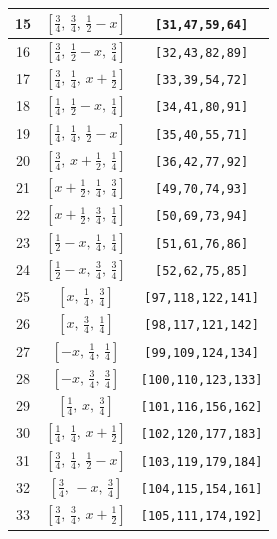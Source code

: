 \documentclass[fleqn,8pt]{jsarticle}
\begin{document}
\begin{longtable}{ccc}
15 & $\left[ \frac{3}{4},\, \frac{3}{4},\, \frac{1}{2} - x \right]$ & {\tt [31,47,59,64]} \\ \hline
16 & $\left[ \frac{3}{4},\, \frac{1}{2} - x,\, \frac{3}{4} \right]$ & {\tt [32,43,82,89]} \\ \hline
17 & $\left[ \frac{3}{4},\, \frac{1}{4},\, x + \frac{1}{2} \right]$ & {\tt [33,39,54,72]} \\ \hline
18 & $\left[ \frac{1}{4},\, \frac{1}{2} - x,\, \frac{1}{4} \right]$ & {\tt [34,41,80,91]} \\ \hline
19 & $\left[ \frac{1}{4},\, \frac{1}{4},\, \frac{1}{2} - x \right]$ & {\tt [35,40,55,71]} \\ \hline
20 & $\left[ \frac{3}{4},\, x + \frac{1}{2},\, \frac{1}{4} \right]$ & {\tt [36,42,77,92]} \\ \hline
21 & $\left[ x + \frac{1}{2},\, \frac{1}{4},\, \frac{3}{4} \right]$ & {\tt [49,70,74,93]} \\ \hline
22 & $\left[ x + \frac{1}{2},\, \frac{3}{4},\, \frac{1}{4} \right]$ & {\tt [50,69,73,94]} \\ \hline
23 & $\left[ \frac{1}{2} - x,\, \frac{1}{4},\, \frac{1}{4} \right]$ & {\tt [51,61,76,86]} \\ \hline
24 & $\left[ \frac{1}{2} - x,\, \frac{3}{4},\, \frac{3}{4} \right]$ & {\tt [52,62,75,85]} \\ \hline
25 & $\left[ x,\, \frac{1}{4},\, \frac{3}{4} \right]$ & {\tt [97,118,122,141]} \\ \hline
26 & $\left[ x,\, \frac{3}{4},\, \frac{1}{4} \right]$ & {\tt [98,117,121,142]} \\ \hline
27 & $\left[ - x,\, \frac{1}{4},\, \frac{1}{4} \right]$ & {\tt [99,109,124,134]} \\ \hline
28 & $\left[ - x,\, \frac{3}{4},\, \frac{3}{4} \right]$ & {\tt [100,110,123,133]} \\ \hline
29 & $\left[ \frac{1}{4},\, x,\, \frac{3}{4} \right]$ & {\tt [101,116,156,162]} \\ \hline
30 & $\left[ \frac{1}{4},\, \frac{1}{4},\, x + \frac{1}{2} \right]$ & {\tt [102,120,177,183]} \\ \hline
31 & $\left[ \frac{3}{4},\, \frac{1}{4},\, \frac{1}{2} - x \right]$ & {\tt [103,119,179,184]} \\ \hline
32 & $\left[ \frac{3}{4},\, - x,\, \frac{3}{4} \right]$ & {\tt [104,115,154,161]} \\ \hline
33 & $\left[ \frac{3}{4},\, \frac{3}{4},\, x + \frac{1}{2} \right]$ & {\tt [105,111,174,192]} \\ \hline

\end{longtable}
\end{document}
